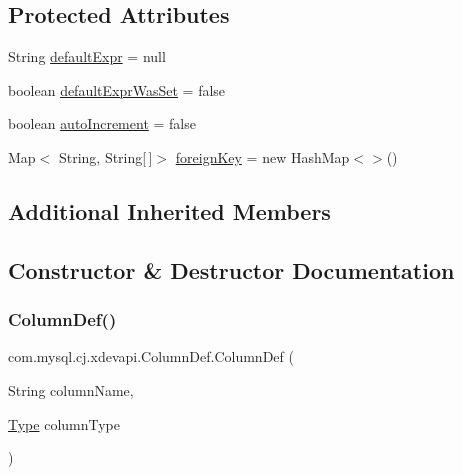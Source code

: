 \subsection*{Protected Attributes}
\begin{DoxyCompactItemize}
\item 
String \mbox{\hyperlink{classcom_1_1mysql_1_1cj_1_1xdevapi_1_1_column_def_aa58ed01d138aa54f92e5466c78bdf78d}{default\+Expr}} = null
\item 
boolean \mbox{\hyperlink{classcom_1_1mysql_1_1cj_1_1xdevapi_1_1_column_def_aa3f6564265658fab4552f1ea1ec00c5e}{default\+Expr\+Was\+Set}} = false
\item 
boolean \mbox{\hyperlink{classcom_1_1mysql_1_1cj_1_1xdevapi_1_1_column_def_a849fba42478bd67641ab37fd1023aa20}{auto\+Increment}} = false
\item 
Map$<$ String, String\mbox{[}$\,$\mbox{]}$>$ \mbox{\hyperlink{classcom_1_1mysql_1_1cj_1_1xdevapi_1_1_column_def_ad35e6cccdcf825ebe933d3d361aed7fa}{foreign\+Key}} = new Hash\+Map$<$$>$()
\end{DoxyCompactItemize}
\subsection*{Additional Inherited Members}


\subsection{Constructor \& Destructor Documentation}
\mbox{\label{classcom_1_1mysql_1_1cj_1_1xdevapi_1_1_column_def_a17b41b3c7326b878f6b4de4cd4a53484}} 
\subsubsection{\texorpdfstring{Column\+Def()}{ColumnDef()}\hspace{0.1cm}{\footnotesize\ttfamily [1/2]}}
{\footnotesize\ttfamily com.\+mysql.\+cj.\+xdevapi.\+Column\+Def.\+Column\+Def (\begin{DoxyParamCaption}\item[{String}]{column\+Name,  }\item[{\mbox{\hyperlink{enumcom_1_1mysql_1_1cj_1_1xdevapi_1_1_type}{Type}}}]{column\+Type }\end{DoxyParamCaption})}

